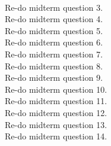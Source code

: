 \documentclass[]{article}
\begin{document}
\begin{qunlist}
 \\
Re-do midterm question 3.
 \\
Re-do midterm question 4.
 \\
Re-do midterm question 5.
 \\
Re-do midterm question 6.
 \\
Re-do midterm question 7.
 \\
Re-do midterm question 8.
 \\
Re-do midterm question 9.
 \\
Re-do midterm question 10.
 \\
Re-do midterm question 11.
 \\
Re-do midterm question 12.
 \\
Re-do midterm question 13.
 \\
Re-do midterm question 14.

\end{qunlist}
\end{document}
